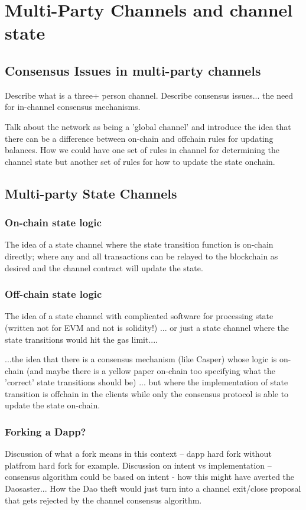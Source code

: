 \section{Multi-Party Channels and channel state}
\subsection{Consensus Issues in multi-party channels}
Describe what is a three+ person channel.
Describe consensus issues... the need for in-channel consensus mechanisms.

Talk about the network as being a 'global channel' and introduce the idea that there can be a difference between on-chain and offchain rules for updating balances.
How we could have one set of rules in channel for determining the channel state but another set of rules for how to update the state onchain.


\subsection{Multi-party State Channels}
\subsubsection*{On-chain state logic}
The idea of a state channel where the state transition function is on-chain directly; where any and all transactions can be relayed to the blockchain as desired and the channel contract will update the state.

\subsubsection*{Off-chain state logic}
The idea of a state channel with complicated software for processing state (written not for EVM and not is solidity!) ... or just a state channel where the state transitions would hit the gas limit.... 

...the idea that there is a consensus mechanism (like Casper) whose logic is on-chain (and maybe there is a yellow paper on-chain too specifying what the 'correct' state transitions should be) ... but where the implementation of state transition is offchain in the clients while only the consensus protocol is able to update the state on-chain.

\subsubsection*{Forking a Dapp?}
Discussion of what a fork means in this context -- dapp hard fork without platfrom hard fork for example. Discussion on intent vs implementation -- consensus algorithm could be based on intent - how this might have averted the Daosaster... How the Dao theft would just turn into a channel exit/close proposal that gets rejected by the channel consensus algorithm.



